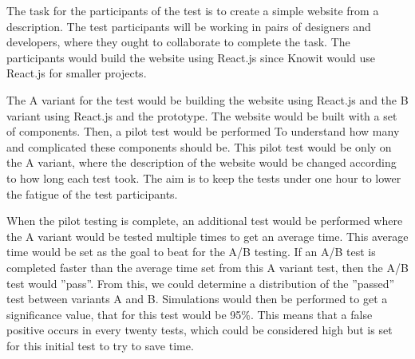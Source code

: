 


The task for the participants of the test is to create a simple website from a description. The test participants will be working in pairs of designers and developers, where they ought to collaborate to complete the task. The participants would build the website using React.js since Knowit would use React.js for smaller projects.  

The A variant for the test would be building the website using React.js and the B variant using React.js and the prototype. The website would be built with a set of components. Then, a pilot test would be performed To understand how many and complicated these components should be.  This pilot test would be only on the A variant, where the description of the website would be changed according to how long each test took. The aim is to keep the tests under one hour to lower the fatigue of the test participants.

When the pilot testing is complete, an additional test would be performed where the A variant would be tested multiple times to get an average time. This average time would be set as the goal to beat for the A/B testing. If an A/B test is completed faster than the average time set from this A variant test, then the A/B test would ''pass''.  From this, we could determine a distribution of the ''passed'' test between variants A and B. Simulations would then be performed to get a significance value, that for this test would be 95\%. This means that a false positive occurs in every twenty tests, which could be considered high but is set for this initial test to try to save time.